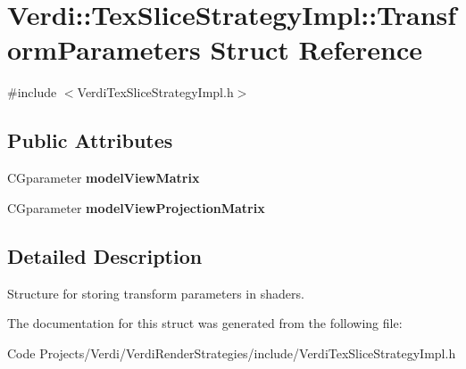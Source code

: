 \hypertarget{struct_verdi_1_1_tex_slice_strategy_impl_1_1_transform_parameters}{\section{\-Verdi\-:\-:\-Tex\-Slice\-Strategy\-Impl\-:\-:\-Transform\-Parameters \-Struct \-Reference}
\label{struct_verdi_1_1_tex_slice_strategy_impl_1_1_transform_parameters}
}


{\ttfamily \#include $<$\-Verdi\-Tex\-Slice\-Strategy\-Impl.\-h$>$}

\subsection*{\-Public \-Attributes}
\begin{DoxyCompactItemize}
\item 
\hypertarget{struct_verdi_1_1_tex_slice_strategy_impl_1_1_transform_parameters_a7e22c32b53ed83eba8b750d79c659569}{\-C\-Gparameter {\bfseries model\-View\-Matrix}}\label{struct_verdi_1_1_tex_slice_strategy_impl_1_1_transform_parameters_a7e22c32b53ed83eba8b750d79c659569}

\item 
\hypertarget{struct_verdi_1_1_tex_slice_strategy_impl_1_1_transform_parameters_a08f3ca92c5207dcb2549a69c5748603c}{\-C\-Gparameter {\bfseries model\-View\-Projection\-Matrix}}\label{struct_verdi_1_1_tex_slice_strategy_impl_1_1_transform_parameters_a08f3ca92c5207dcb2549a69c5748603c}

\end{DoxyCompactItemize}


\subsection{\-Detailed \-Description}
\-Structure for storing transform parameters in shaders. 

\-The documentation for this struct was generated from the following file\-:\begin{DoxyCompactItemize}
\item 
\-Code Projects/\-Verdi/\-Verdi\-Render\-Strategies/include/\-Verdi\-Tex\-Slice\-Strategy\-Impl.\-h\end{DoxyCompactItemize}

